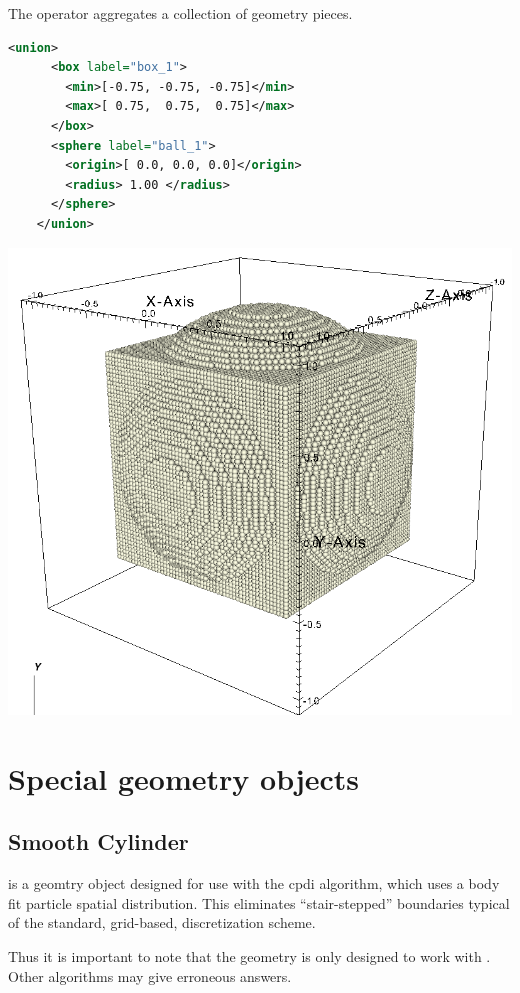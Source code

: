 \begin{minipage}{0.6\textwidth}
  The  operator aggregates a collection of geometry pieces.
  \begin{lstlisting}[language=XML]
    <union>
      <box label="box_1">
        <min>[-0.75, -0.75, -0.75]</min>
        <max>[ 0.75,  0.75,  0.75]</max>
      </box>
      <sphere label="ball_1">
        <origin>[ 0.0, 0.0, 0.0]</origin>
        <radius> 1.00 </radius>
      </sphere>
    </union>
  \end{lstlisting}
\end{minipage}
\begin{minipage}{0.4\textwidth}
  \centering
  \includegraphics[width=0.9\columnwidth]{FIGS/geometry/geom_union.png}
\end{minipage}

\section{Special geometry objects} \label{Sec:SpecialGeometryObjects}
\subsection{Smooth Cylinder}
 is a geomtry object designed for use with
the cpdi algorithm, which uses a body fit particle spatial
distribution.  This eliminates ``stair-stepped'' boundaries typical of
the standard, grid-based, discretization scheme.  
\begin{NoteBox}
Thus it is
  important to note that the  geometry is only designed to work with
  . Other
  algorithms may give erroneous answers.
\end{NoteBox}

